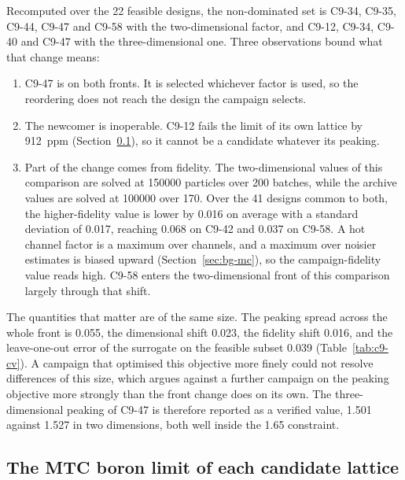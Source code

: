 Recomputed over the 22 feasible designs, the non-dominated set is C9-34,
C9-35, C9-44, C9-47 and C9-58 with the two-dimensional factor, and C9-12,
C9-34, C9-40 and C9-47 with the three-dimensional one. Three observations
bound what that change means:

\begin{enumerate}
  \item C9-47 is on both fronts. It is selected whichever factor is used, so
        the reordering does not reach the design the campaign selects.

  \item The newcomer is inoperable. C9-12 fails the limit of its own
        lattice by \SI{912}{ppm} (Section~\ref{sec:res-c9-ceiling}), so it
        cannot be a candidate whatever its peaking.

  \item Part of the change comes from fidelity. The two-dimensional values of
        this comparison are solved at \num{150000} particles over 200
        batches, while the archive values are solved at \num{100000} over
        170. Over the 41 designs common to both, the higher-fidelity value is
        lower by 0.016 on average with a standard deviation of 0.017,
        reaching 0.068 on C9-42 and 0.037 on C9-58. A hot channel factor is
        a maximum over channels, and a maximum over noisier estimates is
        biased upward (Section~\ref{sec:bg-mc}), so the campaign-fidelity
        value reads high. C9-58 enters the two-dimensional front of this
        comparison largely through that shift.
\end{enumerate}

The quantities that matter are of the same size. The peaking spread across
the whole front is 0.055, the dimensional shift 0.023, the fidelity shift
0.016, and the leave-one-out error of the surrogate on the feasible subset
0.039 (Table~\ref{tab:c9-cv}). A campaign that optimised this objective more
finely could not resolve differences of this size, which argues against a
further campaign on the peaking objective more strongly than the front
change does on its own. The three-dimensional peaking of C9-47 is therefore
reported as a verified value, 1.501 against 1.527 in two dimensions, both
well inside the 1.65 constraint.

\subsection{The MTC boron limit of each candidate lattice}
\label{sec:res-c9-ceiling}

